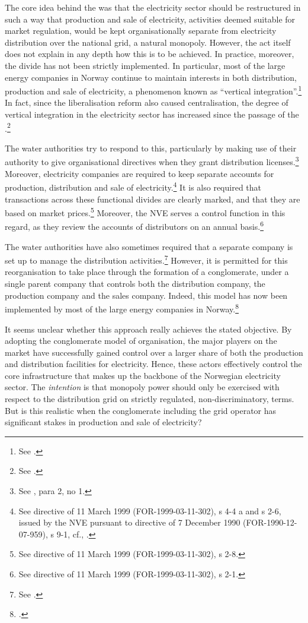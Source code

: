 The core idea behind the \cite{ea90} was that the electricity sector should be restructured in such a way that production and sale of electricity, activities deemed suitable for market regulation, would be kept organisationally separate from electricity distribution over the national grid, a natural monopoly. However, the act itself does not explain in any depth how this is to be achieved. In practice, moreover, the divide has not been strictly implemented. In particular, most of the large energy companies in Norway continue to maintain interests in both distribution, production and sale of electricity, a phenomenon known as ``vertical integration''.\footnote{See \cite[580-583]{bibow03}.} In fact, since the liberalisation reform also caused centralisation, the degree of vertical integration in the electricity sector has increased since the passage of the \cite{ea90}.\footnote{See \cite[583]{bibow03}.}

The water authorities try to respond to this, particularly by making use of their authority to give organisational directives when they grant distribution licenses.\footnote{See \cite[4-1]{ea90}, para 2, no 1.} Moreover, electricity companies are required to keep separate accounts for production, distribution and sale of electricity.\footnote{See directive of 11 March 1999 (FOR-1999-03-11-302), s 4-4 a and s 2-6, issued by the NVE pursuant to directive of 7 December 1990 (FOR-1990-12-07-959), s 9-1, cf., \cite[10-6]{ea90}.} It is also required that transactions across these functional divides are clearly marked, and that they are based on market prices.\footnote{See directive of 11 March 1999 (FOR-1999-03-11-302), s 2-8.} Moreover, the NVE serves a control function in this regard, as they review the accounts of distributors on an annual basis.\footnote{See directive of 11 March 1999 (FOR-1999-03-11-302), s 2-1.}

The water authorities have also sometimes required that a separate company is set up to manage the distribution activities.\footnote{See \cite[581-582]{bibow03}.} However, it is permitted for this reorganisation to take place through the formation of a conglomerate, under a single parent company that controls both the distribution company, the production company and the sales company. Indeed, this model has now been implemented by most of the large energy companies in Norway.\footcite[582]{bibow03}

It seems unclear whether this approach really achieves the stated objective. By adopting the conglomerate model of organisation, the major players on the market have successfully gained control over a larger share of both the production and distribution facilities for electricity. Hence, these actors effectively control the core infrastructure that makes up the backbone of the Norwegian electricity sector. The {\it intention} is that monopoly power should only be exercised with respect to the distribution grid on strictly regulated, non-discriminatory, terms. But is this realistic when the conglomerate including the grid operator has significant stakes in production and sale of electricity?

